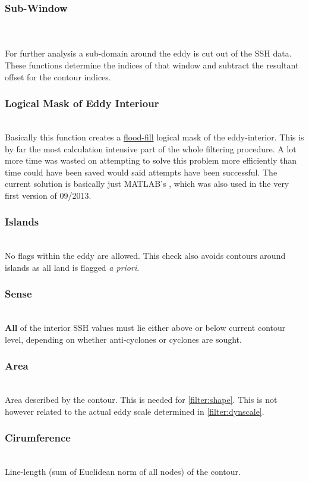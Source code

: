 \subsubsection{Sub-Window}
\\
\\
For further analysis a sub-domain around the eddy is cut out of the SSH data.
These functions determine the indices of that window and subtract the
resultant offset for the contour indices. 
\subsubsection{Logical Mask of Eddy Interiour}
\\
Basically this function creates a
\href{http://en.wikipedia.org/wiki/Flood_fill}{flood-fill} logical mask of the
eddy-interior. This is by far the most calculation intensive part of the whole
filtering procedure. A lot more time was wasted on attempting to solve this
problem more efficiently than time could have been saved would said attempts
have
been successful. The current solution is basically just MATLAB's
, which was also used in the very first version of 09/2013.
\subsubsection{Islands}
\\
No flags within the eddy are allowed. This check also avoids contours around
islands as all land is flagged \textit{a priori}.
\subsubsection{Sense}
\\
\textbf{All} of the interior SSH values must lie either above or below current
contour level, depending on whether anti-cyclones or cyclones are sought.
\subsubsection{Area} \label{filter:area}
\\
Area described by the contour. This is needed for \ref{filter:shape}. This is
not however related to the actual eddy scale determined in
\ref{filter:dynscale}.
\subsubsection{Cirumference}
\\
Line-length (sum of Euclidean norm of all nodes) of the contour.
\newpage

